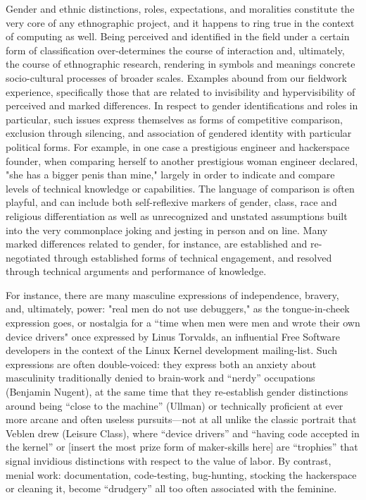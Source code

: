 \documentclass[10pt,letter,oneside]{scrartcl}
\begin{document}
  Gender and ethnic distinctions, roles, expectations, and moralities
  constitute the very core of any ethnographic project, and it happens
  to ring true in the context of computing as well. Being perceived
  and identified in the field under a certain form of classification
  over-determines the course of interaction and, ultimately, the course
  of ethnographic research, rendering in symbols and meanings concrete
  socio-cultural processes of broader scales. Examples abound from our
  fieldwork experience, specifically those that are related to
  invisibility and hypervisibility of perceived and marked
  differences. In respect to gender identifications and roles in
  particular, such issues express themselves as forms of competitive
  comparison, exclusion through silencing, and association of gendered
  identity with particular political forms.  For example, in one case a prestigious
  engineer and hackerspace founder, when comparing herself to another
  prestigious woman engineer declared, "she has a bigger penis than
  mine," largely in order to indicate and compare levels of technical
  knowledge or capabilities.  The language of comparison is often
  playful, and can include both self-reflexive markers of gender,
  class, race and religious differentiation as well as unrecognized
  and unstated assumptions built into the very commonplace joking and
  jesting in person and on line.  Many marked differences related to
  gender, for instance, are established and re-negotiated through
  established forms of technical engagement, and resolved
  through technical arguments and performance of knowledge. 

  For instance, there are many masculine expressions of independence,
  bravery, and, ultimately, power: "real men do not use debuggers," as
  the tongue-in-cheek expression goes, or nostalgia for a ``time when
  men were men and wrote their own device drivers" once expressed by
  Linus Torvalds, an influential Free Software developers in the
  context of the Linux Kernel development mailing-list.  Such
  expressions are often double-voiced: they express both an anxiety
  about masculinity traditionally denied to brain-work and ``nerdy''
  occupations (Benjamin Nugent), at the same time that they
  re-establish gender distinctions around being ``close to the
  machine'' (Ullman) or technically proficient at ever more arcane and
  often useless pursuits---not at all unlike the classic portrait that
  Veblen drew (Leisure Class), where ``device drivers'' and ``having
  code accepted in the kernel'' or [insert the most prize form of
  maker-skills here] are ``trophies'' that signal invidious
  distinctions with respect to the value of labor.  By contrast,
  menial work: documentation, code-testing, bug-hunting, stocking the
  hackerspace or cleaning it, become ``drudgery'' all too often
  associated with the feminine.
\end{document}
